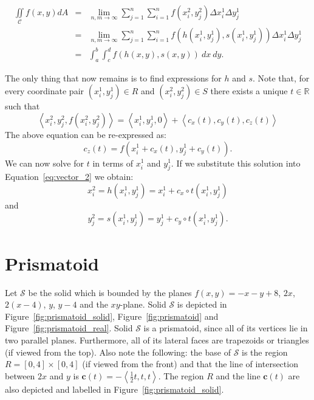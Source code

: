 \documentclass{article}
\theoremstyle{theorem}
\theoremstyle{definition}
\begin{document}
\begin{eqnarray}
\iint\limits_{\!\mathcal{C}} f(x,y) dA &=& \lim_{n,m\rightarrow \infty} \sum_{j=1}^n\sum_{i=1}^n f(x_i^2,y_j^2) \Delta x_i^1\Delta y_j^1\\
&=&  \lim_{n,m\rightarrow \infty} \sum_{j=1}^n\sum_{i=1}^n f(h(x_i^1,y_j^1),s(x_i^1,y_j^1)) \Delta x_i^1\Delta y_j^1\\
&=& \int_a^b\int_c^d f(h(x,y),s(x,y))~dx~dy.
\end{eqnarray}

\noindent
The only thing that now remains is to find expressions for $h$ and $s$. Note that, for every coordinate pair $(x_i^1,y_j^1)\in R$ and $(x_i^2,y_j^2)\in S$ there exists a unique $t\in \mathbb{R}$ such that 
\begin{equation}
\label{eq:vector_2}
\left< x_i^2, y_j^2, f(x_i^2,y_j^2) \right > = \left < x_i^1, y_j^1, 0 \right > + \left <c_x(t),c_y(t),c_z(t)\right >  
\end{equation}
The above equation can be re-expressed as:
\begin{equation}
\label{eq:c_z}
c_z(t) = f(x_i^1 + c_x(t),y_j^1 + c_y(t)). 
\end{equation}
We can now solve for $t$ in terms of $x_i^1$ and $y_j^1$. If we substitute this solution into Equation~\ref{eq:vector_2} we obtain:
\begin{equation}
\label{eq:h_2d}
x_i^2 = h(x_i^1,y_j^1) = x_i^1 + c_x\circ t(x_i^1,y_j^1) 
\end{equation}
and 
\begin{equation}
\label{eq:s_2d}
y_j^2 = s(x_i^1,y_j^1) = y_j^1 + c_y\circ t(x_i^1,y_j^1). 
\end{equation}

\section{Prismatoid}
Let $\mathcal{S}$ be the solid which is bounded by the planes $f(x,y)=-x-y+8$, $2x$, $2(x-4)$, $y$, $y-4$ and the $xy$-plane. Solid $\mathcal{S}$ is depicted 
in Figure~\ref{fig:prismatoid_solid}, Figure~\ref{fig:prismatoid} and Figure~\ref{fig:prismatoid_real}. Solid $\mathcal{S}$ is a prismatoid, since all of its 
vertices lie in two parallel planes. Furthermore, all of its lateral faces are trapezoids or triangles (if viewed from the top). Also note the following: the base of $\mathcal{S}$ is the region 
 $R = [0,4]\times [0,4]$ (if viewed from the front) and that the line of intersection between $2x$ and $y$ is $\mathbf{c}(t) = -\left<\frac{1}{2}t,t,t\right>$. The region $R$ and the line $\mathbf{c}(t)$ are
also depicted and labelled in Figure~\ref{fig:prismatoid_solid}.\\
\end{document}
